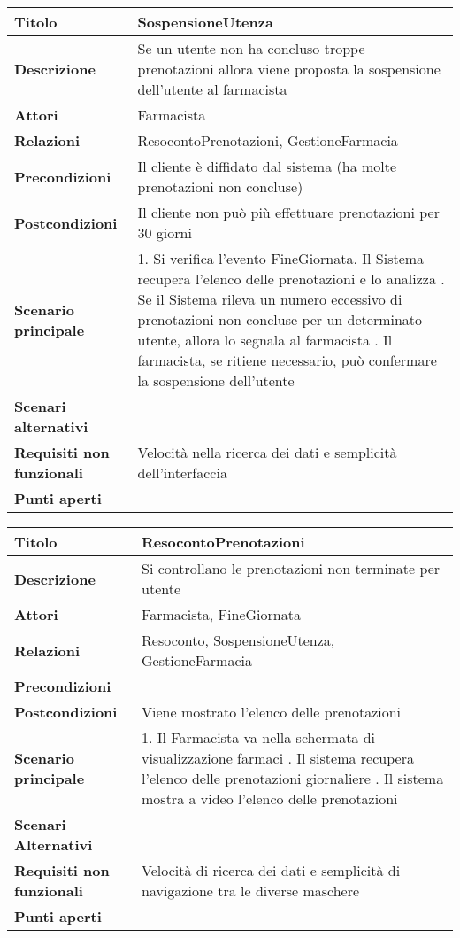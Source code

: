 \begin{tabular} {|P{4.5cm}|P{12.5cm}|}
\hline
  \textbf{Titolo} & SospensioneUtenza\\
\hline
  \textbf{Descrizione} & Se un utente non ha concluso troppe prenotazioni allora viene proposta la sospensione dell'utente al farmacista\\
\hline
  \textbf{Attori} & Farmacista\\
\hline
  \textbf{Relazioni} & ResocontoPrenotazioni, GestioneFarmacia\\
\hline
  \textbf{Precondizioni} & Il cliente è diffidato dal sistema (ha molte prenotazioni non concluse)\\
\hline
  \textbf{Postcondizioni} & Il cliente non può più effettuare prenotazioni per 30 giorni\\
\hline
  \textbf{Scenario principale} & 1. Si verifica l'evento FineGiornata. Il Sistema recupera l'elenco delle prenotazioni e lo analizza . Se il Sistema rileva un numero eccessivo di prenotazioni non concluse per un determinato utente, allora lo segnala al farmacista . Il farmacista, se ritiene necessario, può confermare la sospensione dell'utente\\
\hline
  \textbf{Scenari alternativi} &\\
\hline
  \textbf{Requisiti non funzionali} & Velocità nella ricerca dei dati e semplicità dell'interfaccia\\
\hline
  \textbf{Punti aperti} &\\
\hline
\end{tabular}
\hfill
\break


\begin{tabular} {|P{4.5cm}|P{12.5cm}|}
\hline
  \textbf{Titolo} & ResocontoPrenotazioni\\
\hline
  \textbf{Descrizione} & Si controllano le prenotazioni non terminate per utente\\
\hline
  \textbf{Attori} & Farmacista, FineGiornata\\
\hline
  \textbf{Relazioni} & Resoconto, SospensioneUtenza, GestioneFarmacia\\
\hline
  \textbf{Precondizioni} &\\
\hline
  \textbf{Postcondizioni} & Viene mostrato l'elenco delle prenotazioni\\
\hline
  \textbf{Scenario principale} & 1. Il Farmacista va nella schermata di visualizzazione farmaci . Il sistema recupera l'elenco delle prenotazioni giornaliere . Il sistema mostra a video l'elenco delle prenotazioni\\
\hline
  \textbf{Scenari Alternativi} &\\
\hline
  \textbf{Requisiti non funzionali} & Velocità di ricerca dei dati e semplicità di navigazione tra le diverse maschere\\
\hline
  \textbf{Punti aperti} &\\
\hline
\end{tabular}
\hfill
\break



